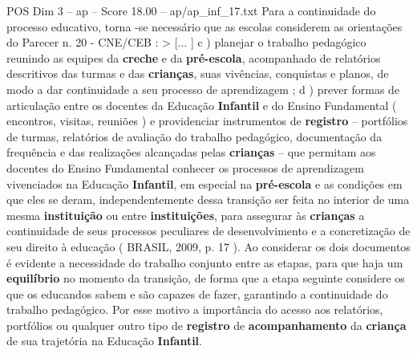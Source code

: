 \begin{textsample}{POS Dim 3 – ap – Score 18.00 – ap/ap\_inf\_17.txt}
Para a continuidade do processo educativo, torna -se necessário que as escolas considerem as orientações do Parecer n. 20 - CNE/CEB : > [... ] c ) planejar o trabalho pedagógico reunindo as equipes da \textbf{creche} e da \textbf{pré-escola}, acompanhado de relatórios descritivos das turmas e das \textbf{crianças}, suas vivências, conquistas e planos, de modo a dar continuidade a seu processo de aprendizagem ; d ) prever formas de articulação entre os docentes da Educação \textbf{Infantil} e do Ensino Fundamental ( encontros, visitas, reuniões ) e providenciar instrumentos de \textbf{registro} – portfólios de turmas, relatórios de avaliação do trabalho pedagógico, documentação da frequência e das realizações alcançadas pelas \textbf{crianças} – que permitam aos docentes do Ensino Fundamental conhecer os processos de aprendizagem vivenciados na Educação \textbf{Infantil}, em especial na \textbf{pré-escola} e as condições em que eles se deram, independentemente dessa transição ser feita no interior de uma mesma \textbf{instituição} ou entre \textbf{instituições}, para assegurar às \textbf{crianças} a continuidade de seus processos peculiares de desenvolvimento e a concretização de seu direito à educação ( BRASIL, 2009, p. 17 ).
Ao considerar os dois documentos é evidente a necessidade do trabalho conjunto entre as etapas, para que haja um \textbf{equilíbrio} no momento da transição, de forma que a etapa seguinte considere os que os educandos sabem e são capazes de fazer, garantindo a continuidade do trabalho pedagógico.
Por esse motivo a importância do acesso aos relatórios, portfólios ou qualquer outro tipo de \textbf{registro} de \textbf{acompanhamento} da \textbf{criança} de sua trajetória na Educação \textbf{Infantil}.

\end{textsample}
